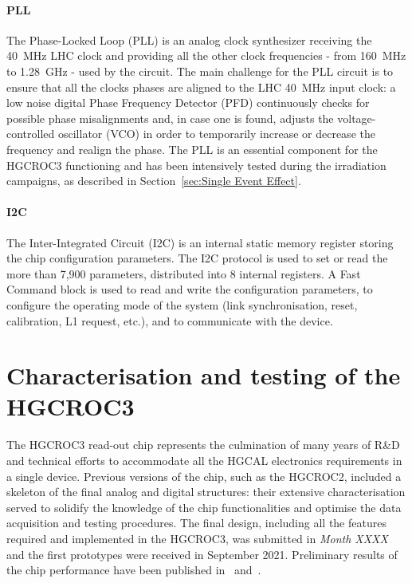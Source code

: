 \paragraph{PLL}
The Phase-Locked Loop (PLL) is an analog clock synthesizer receiving the 40~MHz LHC clock and providing all the other clock frequencies - from 160~MHz to 1.28~GHz - used by the circuit.
The main challenge for the PLL circuit is to ensure that all the clocks phases are aligned to the LHC 40~MHz input clock: a low noise digital Phase Frequency Detector (PFD) continuously checks for possible phase misalignments and, in case one is found, adjusts the voltage-controlled oscillator (VCO) in order to temporarily increase or decrease the frequency and realign the phase. The PLL is an essential component for the HGCROC3 functioning and has been intensively tested during the irradiation campaigns, as described in Section~\ref{sec:Single Event Effect}.

\paragraph{I2C}
The Inter-Integrated Circuit (I2C) is an internal static memory register storing the chip configuration parameters.
The I2C protocol is used to set or read the more than 7,900 parameters, distributed into 8 internal registers.
A Fast Command block is used to read and write the configuration parameters, to configure the operating mode of the system (link synchronisation, reset, calibration, L1 request, etc.), and to communicate with the device.


\section{Characterisation and testing of the HGCROC3}
\label{sec:Characterisation and testing of the HGCROC3}


The HGCROC3 read-out chip represents the culmination of many years of R\&D and technical efforts to accommodate all the HGCAL electronics requirements in a single device. Previous versions of the chip, such as the HGCROC2, included a skeleton of the final analog and digital structures: their extensive characterisation served to solidify the knowledge of the chip functionalities and optimise the data acquisition and testing procedures.
The final design, including all the features required and implemented in the HGCROC3, was submitted in \textit{Month XXXX} and the first prototypes were received in September 2021. Preliminary results of the chip performance have been published in~\cite{Dulucq:2797658} and~\cite{Bombardi:9508012}.

